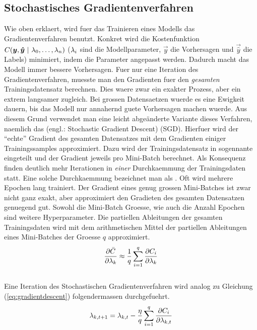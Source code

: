\subsection{Stochastisches Gradientenverfahren}
Wie oben erklaert, wird fuer das Trainieren eines Modells das Gradientenverfahren benutzt.
Konkret wird die Kostenfunktion $C(\vec{y},\vec{\hat{y}}\ |\ \param_0,\ldots,\param_n)$
($\lambda_i$ sind die Modellparameter, $\vec{y}$ die Vorhersagen und $\vec{\hat{y}}$
die Labels) minimiert, indem die Parameter angepasst werden. Dadurch macht das Modell immer bessere Vorhersagen.
Fuer nur eine Iteration des Gradientenverfahren, muesste man den Gradienten fuer den
\textit{gesamten} Trainingsdatensatz berechnen.
Dies waere zwar ein exakter Prozess, aber ein extrem langsamer zugleich.
Bei grossen Datensaetzen wuerde es eine Ewigkeit dauern, bis das Modell nur annahernd guete Vorhersagen machen wuerde.
\para{}
Aus diesem Grund verwendet man eine leicht abgeänderte Variante dieses
Verfahren, naemlich das  (engl.:
Stochastic Gradient Descent) (SGD).
Hierfuer wird der ``echte'' Gradient des gesamten Datensatzes mit dem Gradienten einiger Trainingssamples approximiert.
Dazu wird der Trainingsdatensatz in sogennante  eingeteilt und der Gradient jeweils pro Mini-Batch berechnet.
Als Konsequenz finden deutlich mehr Iterationen in \textit{einer}
Durchkaemmung der Trainingsdaten statt. Eine solche Durchkaemmung bezeichnet man als
. Oft wird mehrere Epochen lang trainiert.
Der Gradient eines genug grossen Mini-Batches ist zwar nicht ganz exakt, aber approximiert den Gradieten des gesamten Datensatzen genuegend gut.
Sowohl die Mini-Batch Groesse, wie auch die Anzahl Epochen sind weitere Hyperparameter.
\para{}
Die partiellen Ableitungen der gesamten Trainingsdaten wird mit dem
arithmetischen Mittel der partiellen Ableitungen eines Mini-Batches der Groesse $q$ approximiert.
\\
\begin{equation}\label{eq:minibatch_deriv}
  \frac{\partial \bar{C}}{\partial \lambda_k} \approx \frac{1}{q}\sum_{i=1}^{q} \frac{\partial C_i}{\partial \lambda_k}
\end{equation}
\\
Eine Iteration des Stochastischen Gradientenverfahren wird analog zu Gleichung (\ref{eq:gradientdescent}) folgendermassen durchgefuehrt.
\\
\begin{equation}\label{eq:sgd}
  \lambda_{k,t+1} = \lambda_{k,t} - \frac{\eta}{q} \sum_{i=1}^{q} \frac{\partial C_i}{\partial \lambda_{k,t}}
\end{equation}

